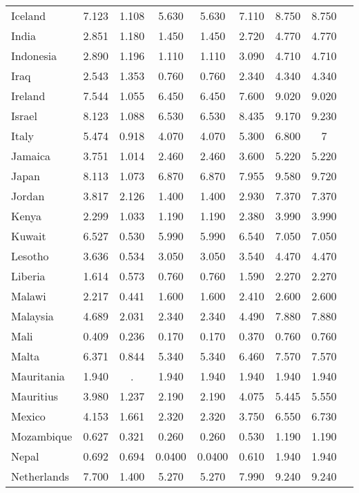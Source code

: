 \documentclass[]{article}
\begin{document}
\begin{tabular}{lcccccccc}
Iceland & 7.123 & 1.108 & 5.630 & 5.630 & 7.110 & 8.750 & 8.750 &  \\
India & 2.851 & 1.180 & 1.450 & 1.450 & 2.720 & 4.770 & 4.770 &  \\
Indonesia & 2.890 & 1.196 & 1.110 & 1.110 & 3.090 & 4.710 & 4.710 &  \\
Iraq & 2.543 & 1.353 & 0.760 & 0.760 & 2.340 & 4.340 & 4.340 &  \\
Ireland & 7.544 & 1.055 & 6.450 & 6.450 & 7.600 & 9.020 & 9.020 &  \\
Israel & 8.123 & 1.088 & 6.530 & 6.530 & 8.435 & 9.170 & 9.230 &  \\
Italy & 5.474 & 0.918 & 4.070 & 4.070 & 5.300 & 6.800 & 7 &  \\
Jamaica & 3.751 & 1.014 & 2.460 & 2.460 & 3.600 & 5.220 & 5.220 &  \\
Japan & 8.113 & 1.073 & 6.870 & 6.870 & 7.955 & 9.580 & 9.720 &  \\
Jordan & 3.817 & 2.126 & 1.400 & 1.400 & 2.930 & 7.370 & 7.370 &  \\
Kenya & 2.299 & 1.033 & 1.190 & 1.190 & 2.380 & 3.990 & 3.990 &  \\
Kuwait & 6.527 & 0.530 & 5.990 & 5.990 & 6.540 & 7.050 & 7.050 &  \\
Lesotho & 3.636 & 0.534 & 3.050 & 3.050 & 3.540 & 4.470 & 4.470 &  \\
Liberia & 1.614 & 0.573 & 0.760 & 0.760 & 1.590 & 2.270 & 2.270 &  \\
Malawi & 2.217 & 0.441 & 1.600 & 1.600 & 2.410 & 2.600 & 2.600 &  \\
Malaysia & 4.689 & 2.031 & 2.340 & 2.340 & 4.490 & 7.880 & 7.880 &  \\
Mali & 0.409 & 0.236 & 0.170 & 0.170 & 0.370 & 0.760 & 0.760 &  \\
Malta & 6.371 & 0.844 & 5.340 & 5.340 & 6.460 & 7.570 & 7.570 &  \\
Mauritania & 1.940 & . & 1.940 & 1.940 & 1.940 & 1.940 & 1.940 &  \\
Mauritius & 3.980 & 1.237 & 2.190 & 2.190 & 4.075 & 5.445 & 5.550 &  \\
Mexico & 4.153 & 1.661 & 2.320 & 2.320 & 3.750 & 6.550 & 6.730 &  \\
Mozambique & 0.627 & 0.321 & 0.260 & 0.260 & 0.530 & 1.190 & 1.190 &  \\
Nepal & 0.692 & 0.694 & 0.0400 & 0.0400 & 0.610 & 1.940 & 1.940 &  \\
Netherlands & 7.700 & 1.400 & 5.270 & 5.270 & 7.990 & 9.240 & 9.240 &  \\

\end{tabular}
\end{document}
